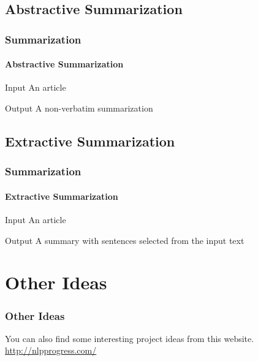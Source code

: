 \documentclass{beamer}
\begin{document}
\subsection{Abstractive Summarization}
\begin{frame}
    \frametitle{Summarization}
    \framesubtitle{Abstractive Summarization}
    \begin{block}{Input}
        An article
    \end{block}
    
    \begin{block}{Output}
        A non-verbatim summarization
    \end{block}
\end{frame}

\subsection{Extractive Summarization}
\begin{frame}
    \frametitle{Summarization}
    \framesubtitle{Extractive Summarization}
    \begin{block}{Input}
        An article
    \end{block}
    
    \begin{block}{Output}
        A summary with sentences selected from the input text
    \end{block}
\end{frame}

\section{Other Ideas}
\begin{frame}
    \frametitle{Other Ideas}
    You can also find some interesting project ideas from this website.
    \href{http://nlpprogress.com/}{http://nlpprogress.com/}
\end{frame}
\end{document}
